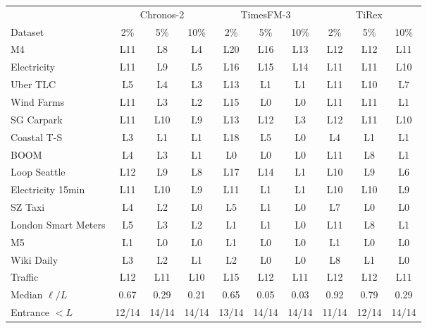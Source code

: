 \begin{tabular}{l ccc ccc ccc}
\toprule
 & \multicolumn{3}{c}{Chronos-2} & \multicolumn{3}{c}{TimesFM-3} & \multicolumn{3}{c}{TiRex} \\
\cmidrule(lr){2-4}\cmidrule(lr){5-7}\cmidrule(lr){8-10}
Dataset & 2\% & 5\% & 10\% & 2\% & 5\% & 10\% & 2\% & 5\% & 10\% \\
\midrule
M4 & L11 & L8 & L4 & L20 & L16 & L13 & L12 & L12 & L11 \\
Electricity & L11 & L9 & L5 & L16 & L15 & L14 & L11 & L11 & L10 \\
Uber TLC & L5 & L4 & L3 & L13 & L1 & L1 & L11 & L10 & L7 \\
Wind Farms & L11 & L3 & L2 & L15 & L0 & L0 & L11 & L11 & L1 \\
SG Carpark & L11 & L10 & L9 & L13 & L12 & L3 & L12 & L11 & L10 \\
Coastal T-S & L3 & L1 & L1 & L18 & L5 & L0 & L4 & L1 & L1 \\
BOOM & L4 & L3 & L1 & L0 & L0 & L0 & L11 & L8 & L1 \\
Loop Seattle & L12 & L9 & L8 & L17 & L14 & L1 & L10 & L9 & L6 \\
Electricity 15min & L11 & L10 & L9 & L11 & L1 & L1 & L10 & L10 & L9 \\
SZ Taxi & L4 & L2 & L0 & L5 & L1 & L0 & L7 & L0 & L0 \\
London Smart Meters & L5 & L3 & L2 & L1 & L1 & L0 & L11 & L8 & L1 \\
M5 & L1 & L0 & L0 & L1 & L0 & L0 & L1 & L0 & L0 \\
Wiki Daily & L3 & L2 & L1 & L2 & L0 & L0 & L8 & L1 & L0 \\
Traffic & L12 & L11 & L10 & L15 & L12 & L11 & L12 & L12 & L11 \\
\midrule
Median $\ell/L$ & 0.67 & 0.29 & 0.21 & 0.65 & 0.05 & 0.03 & 0.92 & 0.79 & 0.29 \\
Entrance $<L$ & 12/14 & 14/14 & 14/14 & 13/14 & 14/14 & 14/14 & 11/14 & 12/14 & 14/14 \\
\bottomrule
\end{tabular}
